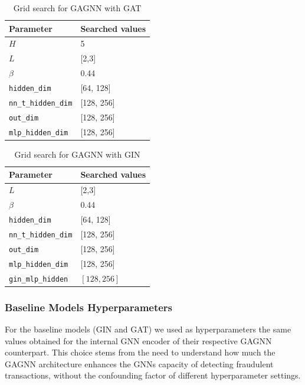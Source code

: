 \begin{table}
\centering
\begin{tabular}{l l}
\hline
\textbf{Parameter} & \textbf{Searched values} \\
\hline
\(H\) & 5 \\
\(L\) & [2,3] \\
\(\beta\) & 0.44 \\
\texttt{hidden\_dim} & [64, 128]\\
\texttt{nn\_t\_hidden\_dim} & [128, 256]\\
\texttt{out\_dim} & [128, 256]\\
\texttt{mlp\_hidden\_dim} & [128, 256]\\
\hline
\end{tabular}
\caption{Grid search for GAGNN with GAT}
\label{tab:phase2_gat}
\end{table}

\begin{table}
\centering
\begin{tabular}{l l}
\hline
\textbf{Parameter} & \textbf{Searched values}\\
\hline
\(L\) & [2,3] \\
\(\beta\) & 0.44 \\
\texttt{hidden\_dim} & [64, 128]\\
\texttt{nn\_t\_hidden\_dim} & [128, 256]\\
\texttt{out\_dim} & [128, 256]\\
\texttt{mlp\_hidden\_dim} & [128, 256]\\
\texttt{gin\_mlp\_hidden} & $[128, 256]$\\
\hline
\end{tabular}
\caption{Grid search for GAGNN with GIN}
\label{tab:phase2_gin}
\end{table}

\subsubsection{Baseline Models Hyperparameters}
\label{sec:baseline_hp}

For the baseline models (GIN and GAT) we used as hyperparameters the same values obtained for the internal GNN encoder of their respective GAGNN counterpart. 
This choice stems from the need to understand how much the GAGNN architecture enhances the GNNs capacity of detecting fraudulent transactions, without the confounding factor of different hyperparameter settings. 


